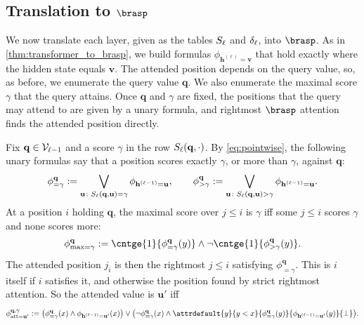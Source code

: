 \subsection{Translation to \texorpdfstring{$\brasp$}{B-RASP}}
\label{sec:uhat_to_brasp}

We now translate each layer, given as the tables $S_\ell$ and $\delta_\ell$, into $\brasp$.
As in \cref{thm:transformer_to_brasp}, we build formulas $\phi_{\mathbf{h}^{(\ell)}=\mathbf{v}}$ that hold
exactly where the hidden state equals $\mathbf{v}$.
The attended position depends on the query value, so, as before, we enumerate the query value
$\mathbf{q}$. We also enumerate the maximal score $\gamma$ that the query attains.
Once $\mathbf{q}$ and $\gamma$ are fixed, the positions that the query may attend to are given by a unary formula,
and rightmost $\brasp$ attention finds the attended position directly.

Fix $\mathbf{q}\in\mathcal{V}_{\ell-1}$ and a score $\gamma$ in the row $S_\ell(\mathbf{q},\cdot)$. By \cref{eq:pointwise},
the following unary formulas say that a position scores exactly $\gamma$, or more than $\gamma$, against $\mathbf{q}$:
\[
\phi^{\mathbf{q}}_{=\gamma} := \bigvee_{\mathbf{u}\colon S_\ell(\mathbf{q},\mathbf{u})=\gamma}\phi_{\mathbf{h}^{(\ell-1)}=\mathbf{u}},
\qquad
\phi^{\mathbf{q}}_{>\gamma} := \bigvee_{\mathbf{u}\colon S_\ell(\mathbf{q},\mathbf{u})>\gamma}\phi_{\mathbf{h}^{(\ell-1)}=\mathbf{u}}.
\]
At a position $i$ holding $\mathbf{q}$, the maximal score over $j\leq i$ is $\gamma$ iff some
$j\leq i$ scores $\gamma$ and none scores more:
\[
\phi^{\mathbf{q}}_{\max=\gamma} := \cntge{1}{\phi^{\mathbf{q}}_{=\gamma}(y)} \land \lnot\cntge{1}{\phi^{\mathbf{q}}_{>\gamma}(y)}.
\]
The attended position $j_i$ is then the rightmost $j\leq i$ satisfying $\phi^{\mathbf{q}}_{=\gamma}$. This is
$i$ itself if $i$ satisfies it, and otherwise the position found by strict rightmost attention.
So the attended value is $\mathbf{u}'$ iff
\[
\phi^{\mathbf{q},\gamma}_{\mathrm{att}=\mathbf{u}'} :=
\bigl(\phi^{\mathbf{q}}_{=\gamma}(x)\land\phi_{\mathbf{h}^{(\ell-1)}=\mathbf{u}'}(x)\bigr)\lor
\bigl(\lnot\phi^{\mathbf{q}}_{=\gamma}(x)\land
\attrdefault{y}{y<x}{\phi^{\mathbf{q}}_{=\gamma}(y)}{\phi_{\mathbf{h}^{(\ell-1)}=\mathbf{u}'}(y)}{\bot}\bigr).
\]

